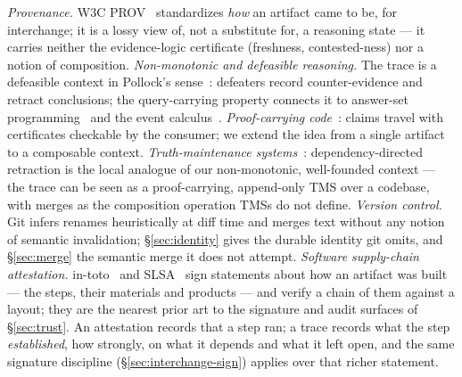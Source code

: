 \documentclass[11pt]{article}
\begin{document}
\emph{Provenance.} W3C PROV~\cite{prov} standardizes \emph{how} an artifact came to be, for interchange; it
is a lossy view of, not a substitute for, a reasoning state --- it carries neither the evidence-logic
certificate (freshness, contested-ness) nor a notion of composition. \emph{Non-monotonic and defeasible
reasoning.} The trace is a defeasible context in Pollock's sense~\cite{pollock}: defeaters record
counter-evidence and retract conclusions; the query-carrying property connects it to answer-set
programming~\cite{asp} and the event calculus~\cite{ec}. \emph{Proof-carrying code}~\cite{pcc}: claims travel
with certificates checkable by the consumer; we extend the idea from a single artifact to a composable
context. \emph{Truth-maintenance systems}~\cite{atms}: dependency-directed retraction is the local analogue
of our non-monotonic, well-founded context --- the trace can be seen as a proof-carrying, append-only TMS
over a codebase, with merges as the composition operation TMSs do not define. \emph{Version control.} Git
infers renames heuristically at diff time and merges text without any notion of semantic invalidation;
\S\ref{sec:identity} gives the durable identity git omits, and \S\ref{sec:merge} the semantic merge it does
not attempt. \emph{Software supply-chain attestation.} in-toto~\cite{intoto} and SLSA~\cite{slsa} sign
statements about how an artifact was built --- the steps, their materials and products --- and verify a chain
of them against a layout; they are the nearest prior art to the signature and audit surfaces of
\S\ref{sec:trust}. An attestation records that a step ran; a trace records what the step \emph{established},
how strongly, on what it depends and what it left open, and the same signature discipline
(\S\ref{sec:interchange-sign}) applies over that richer statement.
\end{document}
